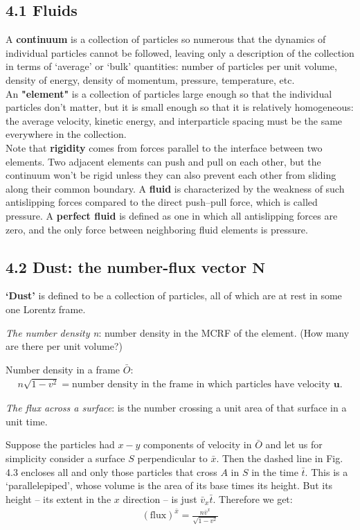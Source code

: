 \documentclass[12pt]{book}
\begin{document}
    \subsection{4.1 Fluids}
        A \textbf{continuum} is a collection of particles so numerous that the dynamics of individual particles cannot be followed, leaving only a description of the collection in terms of ‘average’ or ‘bulk’ quantities: number of particles per unit volume, density of energy, density of momentum, pressure, temperature, etc.\\
        An \textbf{"element"} is a collection of particles large enough so that the individual particles don’t matter, but it is small enough so that it is relatively homogeneous: the average velocity, kinetic energy, and interparticle spacing must be the same everywhere in the collection.\\
        Note that \textbf{rigidity} comes from forces parallel to the interface between two elements. Two adjacent elements can push and pull on each other, but the continuum won’t be rigid unless they can also prevent each other from sliding along their common boundary. A \textbf{fluid} is characterized by the weakness of such antislipping forces compared to the direct push–pull force, which is called pressure. A \textbf{perfect fluid} is defined as one in which all antislipping forces are zero, and the only force between neighboring fluid elements is pressure.

    \subsection{4.2 Dust: the number-flux vector $\mathbf{N}$}
    
    \textbf{‘Dust’} is defined to be a collection of particles, all of which are at rest in some one Lorentz frame.

    \textit{The number density n}: number density in the MCRF of the element. (How many are there per unit volume?)
    
    Number density in a frame \(\bar{O}\):
    \begin{align}
    n \sqrt{1 - v^2} = \text{number density in the frame in which particles have velocity } \mathbf{u}.
    \tag{4.2}
    \end{align}

    \textit{The flux across a surface}: is the number crossing a unit area of that surface in a unit time. 

    Suppose the particles had $x-y$ components of velocity in \(\bar{O}\) and let us for simplicity consider a surface $S$ perpendicular to $\bar{x}$. Then the dashed line in Fig. 4.3 encloses all and only those particles that cross \(A\) in \(S\) in the time \(\bar{t}\). This is a ‘parallelepiped’, whose volume is the area of its base times its height. But its height – its extent in the \(x\) direction – is just \(\bar{v}_x \bar{t}\). Therefore we get:
    \begin{align}
    (\text{flux})^{\bar{x}} = \frac{n \bar{v}^x }{\sqrt{1 - v^2}}
    \tag{4.3}
    \end{align}
\end{document}
